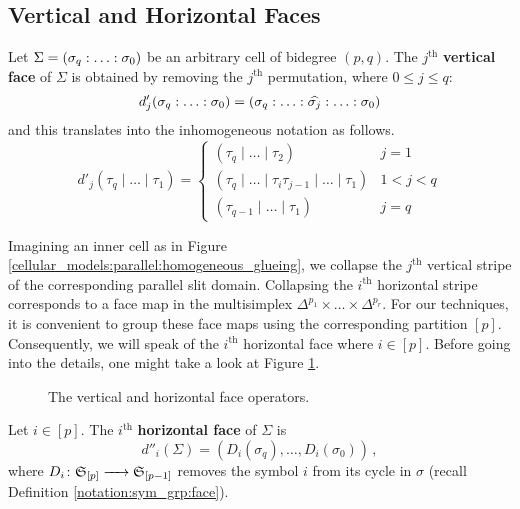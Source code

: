 \subsection{Vertical and Horizontal Faces}
\label{cellular_models:parallel:faces}

\begin{defi}
\label{cellular_models:parallel:dv}
Let $\Sigma = \homogq$ be an arbitrary cell of bidegree $(p,q)$.
The $j^{\text{th}}$ {\bf vertical face} of $\Sigma$ is obtained by removing the $j^{\text{th}}$ permutation, where $0 \le j \le q$:
\[
    d'_j \homogq = (\sigma_q: \ldots: \widehat{\sigma_j}: \ldots: \sigma_0)
\]
and this translates into the inhomogeneous notation as follows.
\[
    d'_j(\tau_q \mid \ldots \mid \tau_1) =
        \begin{cases}
            (\tau_q \mid \ldots \mid \tau_2) & j = 1 \\
            (\tau_q \mid \ldots \mid \tau_i \tau_{j-1} \mid \ldots \mid \tau_1) & 1 < j < q \\
            (\tau_{q-1} \mid \ldots \mid \tau_1) & j = q
        \end{cases}
\]
\end{defi}

Imagining an inner cell as in Figure \ref{cellular_models:parallel:homogeneous_glueing}, we collapse the $j^{\text{th}}$ vertical stripe of the corresponding parallel slit domain.
Collapsing the $i^{\text{th}}$ horizontal stripe corresponds to a face map in the multisimplex $\Delta^{p_1} \times \ldots \times \Delta^{p_r}$.
For our techniques, it is convenient to group these face maps using the corresponding partition $[p]$.
Consequently, we will speak of the $i^{\text{th}}$ horizontal face where $i \in [p]$.
Before going into the details, one might take a look at Figure \ref{cellular_models:parallel:comparison_face_operators}.
\begin{figure}[ht]
\centering
{}
\caption{\label{cellular_models:parallel:comparison_face_operators}The vertical and horizontal face operators.}
\end{figure}

\begin{defi}
\label{cellular_models:parallel:dh}
Let $i \in [p]$.
The $i^{\text{th}}$ {\bf horizontal face} of $\Sigma$ is
\[ 
    d''_i(\Sigma) = (D_i(\sigma_q), \dotsc, D_i(\sigma_0))\,,
\]
where $D_i \colon \mathfrak S_{[p]} \xrightarrow{\hspace{6pt}{}\hspace{6pt}} \mathfrak S_{[p-1]}$ removes the symbol $i$ from its cycle in $\sigma$ (recall Definition \ref{notation:sym_grp:face}).
\end{defi}

